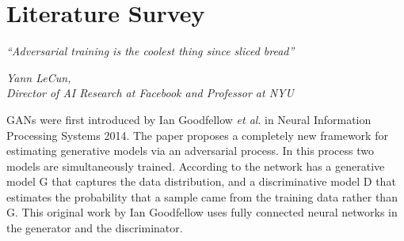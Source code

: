 
\chapter{Literature Survey}\label{ch:literature_survey}
\epigraph{\textit{ \normalsize“Adversarial training is the coolest thing since sliced bread”}}{\normalsize\textit{Yann LeCun,\\ Director of AI Research at Facebook and Professor at NYU}}


GANs were first introduced by Ian Goodfellow \textit{et al}. \cite{gan} in Neural Information Processing Systems 2014. The paper proposes a completely new framework for estimating generative models via an adversarial process. In this process two models are simultaneously trained. According to \cite{gan} the network has a generative model G that captures the data distribution, and a discriminative model D that estimates the probability that a sample came from the training data rather than G. This original work by Ian Goodfellow uses fully connected neural networks in the generator and the discriminator. 
\par\bigskip

